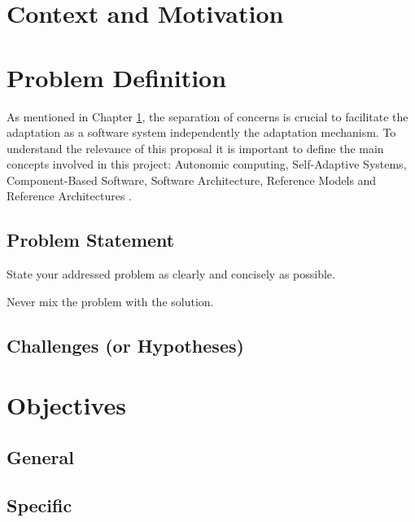 \documentclass[letterpaper,11pt]{report}
\begin{document}
\chapter{Context and Motivation}
\label{cha:MotivationBackground}


\chapter{Problem Definition}
\label{cha:ProblemDef}

As mentioned in Chapter \ref{cha:MotivationBackground}, the separation of concerns is crucial to facilitate the adaptation as a software system independently the adaptation mechanism. To understand the relevance of this proposal it is important to define the main concepts involved in this project: Autonomic computing, Self-Adaptive Systems, Component-Based Software, Software Architecture, Reference Models and Reference Architectures \cite{delemos-et-al:2011:software-engineering-for-sas-roadmap-2}.


\section{Problem Statement}
\label{sec:ProblStatmt}

State your addressed problem as clearly and concisely as possible.

Never mix the problem with the solution.


\section{Challenges (or Hypotheses)}
\label{sec:Challenges}




\chapter{Objectives}
\label{cha:Objectives}

\section{General}

\section{Specific}
\end{document}
